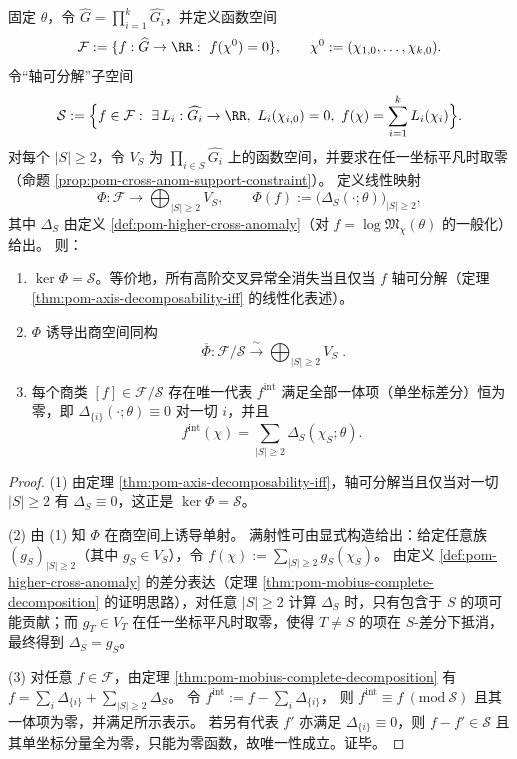 \begin{theorem}\label{thm:pom-euler-defect-quotient-coordinate}
固定 \(\theta\)，令 \(\widehat G=\prod_{i=1}^k\widehat{G_i}\)，并定义函数空间
\[
\mathcal{F}:=\{f:\widehat G\to\RR:\ f(\chi^0)=0\},
\qquad
\chi^0:=(\chi_{1,0},\dots,\chi_{k,0}).
\]
令“轴可分解”子空间
\[
\mathcal{S}:=
\Bigl\{f\in\mathcal{F}:\ \exists\,L_i:\widehat{G_i}\to\RR,\ L_i(\chi_{i,0})=0,\ f(\chi)=\sum_{i=1}^k L_i(\chi_i)\Bigr\}.
\]
对每个 \(|S|\ge 2\)，令 \(V_S\) 为 \(\prod_{i\in S}\widehat{G_i}\) 上的函数空间，并要求在任一坐标平凡时取零（命题 \ref{prop:pom-cross-anom-support-constraint}）。
定义线性映射
\[
\Phi:\mathcal{F}\longrightarrow \bigoplus_{|S|\ge 2}V_S,\qquad
\Phi(f):=\bigl(\Delta_S(\cdot;\theta)\bigr)_{|S|\ge 2},
\]
其中 \(\Delta_S\) 由定义 \ref{def:pom-higher-cross-anomaly}（对 \(f=\log\mathfrak{M}_\chi(\theta)\) 的一般化）给出。
则：
\begin{enumerate}
  \item \(\ker\Phi=\mathcal{S}\)。等价地，所有高阶交叉异常全消失当且仅当 \(f\) 轴可分解（定理 \ref{thm:pom-axis-decomposability-iff} 的线性化表述）。
  \item \(\Phi\) 诱导出商空间同构
  \[
  \boxed{\;
  \overline\Phi:\mathcal{F}/\mathcal{S}\xrightarrow{\ \sim\ }\bigoplus_{|S|\ge 2}V_S\; }.
  \]
  \item 每个商类 \([f]\in\mathcal{F}/\mathcal{S}\) 存在唯一代表 \(f^{\mathrm{int}}\) 满足全部一体项（单坐标差分）恒为零，即
  \(
  \Delta_{\{i\}}(\cdot;\theta)\equiv 0
  \)
  对一切 \(i\)，并且
  \[
  f^{\mathrm{int}}(\chi)=\sum_{|S|\ge 2}\Delta_S(\chi_S;\theta).
  \]
\end{enumerate}
\end{theorem}
\begin{proof}
(1) 由定理 \ref{thm:pom-axis-decomposability-iff}，轴可分解当且仅当对一切 \(|S|\ge 2\) 有 \(\Delta_S\equiv 0\)，这正是 \(\ker\Phi=\mathcal{S}\)。
\par
(2) 由 (1) 知 \(\Phi\) 在商空间上诱导单射。
满射性可由显式构造给出：给定任意族 \((g_S)_{|S|\ge 2}\)（其中 \(g_S\in V_S\)），令
\(
f(\chi):=\sum_{|S|\ge 2} g_S(\chi_S)
\)。
由定义 \ref{def:pom-higher-cross-anomaly} 的差分表达（定理 \ref{thm:pom-mobius-complete-decomposition} 的证明思路），对任意 \(|S|\ge 2\) 计算 \(\Delta_S\) 时，只有包含于 \(S\) 的项可能贡献；而 \(g_T\in V_T\) 在任一坐标平凡时取零，使得 \(T\neq S\) 的项在 \(S\)-差分下抵消，最终得到 \(\Delta_S=g_S\)。
\par
(3) 对任意 \(f\in\mathcal{F}\)，由定理 \ref{thm:pom-mobius-complete-decomposition} 有
\(
f=\sum_{i}\Delta_{\{i\}}+\sum_{|S|\ge 2}\Delta_S
\)。
令
\(
f^{\mathrm{int}}:=f-\sum_i \Delta_{\{i\}}
\)，
则 \(f^{\mathrm{int}}\equiv f\ (\mathrm{mod}\ \mathcal{S})\) 且其一体项为零，并满足所示表示。
若另有代表 \(f'\) 亦满足 \(\Delta_{\{i\}}\equiv 0\)，则 \(f-f'\in\mathcal{S}\) 且其单坐标分量全为零，只能为零函数，故唯一性成立。证毕。
\end{proof}

